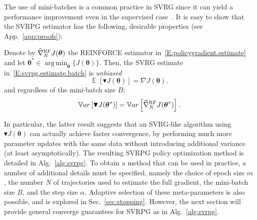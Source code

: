 \documentclass{article}
\theoremstyle{remark}
\theoremstyle{definition}
\newcommand{\todopir}[1]{\todo[color=blued, inline]{\small #1}}
\DeclareMathOperator*{\argmin}{arg\,min}
\newcommand{\vtheta}{\boldsymbol{\theta}}
\newcommand{\Reward}{\mathcal{R}}
\newcommand{\gradJ}[1]{\nabla J(#1)}
\newcommand{\gradApp}[2]{\widehat{\nabla}_{#2}J(#1)}
\newcommand{\gradBlack}[1]{\blacktriangledown J(#1)}
\newcommand{\wh}[1]{\widehat{#1}}
\begin{document}
The use of mini-batches is a common practice in SVRG since it can yield a performance improvement even in the supervised case~\citep{harikandeh2015stopwasting,konevcny2016mini}. It is easy to show that the SVRPG estimator has the following, desirable properties (see App.~\ref{app:proofs}):
\begin{lemma}
Denote by $\wh{\nabla}_N^{\textsc{RF}} J(\vtheta)$ the REINFORCE estimator in~\eqref{E:policygradient.estimate} and let $\vtheta^* \in \argmin_{\vtheta} \{J(\vtheta)\}$. Then, the SVRG estimate in~\eqref{E:svrpg.estimate.batch} is \emph{unbiased}
\[
\mathop{\mathbb{E}}
\left[\blacktriangledown J(\vtheta)\right] = \gradJ{\vtheta}.
\]
and regardless of the mini-batch size $B$:
\[
	\mathbb{V}ar\left[\gradBlack{\vtheta^*}\right] = 
    \mathbb{V}ar\left[\wh{\nabla}_N^{\textsc{RF}}J(\vtheta^*)\right].
\]
\todopir{Definition of Var??}
\end{lemma}

In particular, the latter result suggests that an SVRG-like algorithm using $\gradBlack{\vtheta}$ can actually achieve faster convergence, by performing much more parameter updates with the same data without introducing additional variance (at least asymptotically).
The resulting SVRPG policy optimization method is detailed in Alg.~\ref{alg:svrpg}.
To obtain a method that can be used in practice, a number of additional details must be specified, namely the choice of epoch size $m$, the number $N$ of trajectories used to estimate the full gradient, the mini-batch size $B$, and the step size $\alpha$.
Adaptive selection of these meta-parameters is also possible, and is explored in Sec.~\ref{sec:stopping}.
However, the next section will provide general converge guarantees for SVRPG as in Alg.~\ref{alg:svrpg}.
\end{document}
